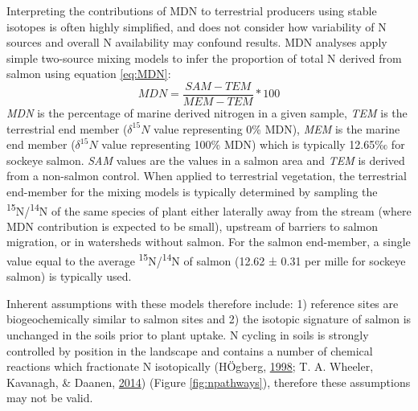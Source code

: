 \documentclass [11pt, proquest] {uwthesis}[2015/03/03]
\begin{document}
Interpreting the contributions of MDN to terrestrial producers using
stable isotopes is often highly simplified, and does not consider how
variability of N sources and overall N availability may confound
results. MDN analyses apply simple two-source mixing models to infer the
proportion of total N derived from salmon using equation \eqref{eq:MDN}:
\begin{equation} 
  MDN = \frac{SAM-TEM}{MEM-TEM}*100
  \label{eq:MDN}
\end{equation}
\emph{MDN} is the percentage of marine derived nitrogen in a given
sample, \emph{TEM} is the terrestrial end member (\(\delta^{15}N\) value
representing 0\% MDN), \emph{MEM} is the marine end member
(\(\delta^{15}N\) value representing 100\% MDN) which is typically
12.65‰ for sockeye salmon. \emph{SAM} values are the values in a salmon
area and \emph{TEM} is derived from a non-salmon control. When applied
to terrestrial vegetation, the terrestrial end-member for the mixing
models is typically determined by sampling the
\textsuperscript{15}N/\textsuperscript{14}N of the same species of plant
either laterally away from the stream (where MDN contribution is
expected to be small), upstream of barriers to salmon migration, or in
watersheds without salmon. For the salmon end-member, a single value
equal to the average \textsuperscript{15}N/\textsuperscript{14}N of
salmon (12.62 ± 0.31 per mille for sockeye salmon) is typically used.

Inherent assumptions with these models therefore include: 1) reference
sites are biogeochemically similar to salmon sites and 2) the isotopic
signature of salmon is unchanged in the soils prior to plant uptake. N
cycling in soils is strongly controlled by position in the landscape and
contains a number of chemical reactions which fractionate N isotopically
(HÖgberg, \protect\hyperlink{ref-Hogberg1998}{1998}; T. A. Wheeler,
Kavanagh, \& Daanen, \protect\hyperlink{ref-Wheeler2014}{2014}) (Figure
\ref{fig:npathways}), therefore these assumptions may not be valid.
\end{document}
